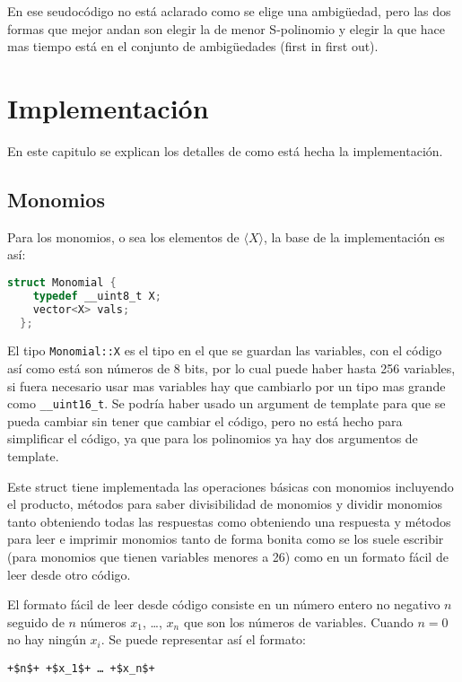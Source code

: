 \documentclass{amsbook} %
\theoremstyle{customstyle}
\theoremstyle{factstyle}
\begin{document}
En ese seudocódigo no está aclarado como se elige una ambigüedad, pero las dos formas que mejor andan son elegir la de menor S-polinomio y elegir la que hace mas tiempo está en el conjunto de ambigüedades (first in first out).

\chapter{Implementación}

En este capitulo se explican los detalles de como está hecha la implementación.

\section{Monomios}

Para los monomios, o sea los elementos de $⟨X⟩$, la base de la implementación es así:

\begin{lstlisting}[language=C++]
  struct Monomial {
    typedef __uint8_t X;
    vector<X> vals;
  };
\end{lstlisting}

El tipo \texttt{Monomial::X} es el tipo en el que se guardan las variables, con el código así como está son números de 8 bits, por lo cual puede haber hasta 256 variables, si fuera necesario usar mas variables hay que cambiarlo por un tipo mas grande como \texttt{\_\_uint16\_t}. Se podría haber usado un argument de template para que se pueda cambiar sin tener que cambiar el código, pero no está hecho para simplificar el código, ya que para los polinomios ya hay dos argumentos de template.

Este struct tiene implementada las operaciones básicas con monomios incluyendo el producto, métodos para saber divisibilidad de monomios y dividir monomios tanto obteniendo todas las respuestas como obteniendo una respuesta y métodos para leer e imprimir monomios tanto de forma bonita como se los suele escribir (para monomios que tienen variables menores a 26) como en un formato fácil de leer desde otro código.

El formato fácil de leer desde código consiste en un número entero no negativo $n$ seguido de $n$ números $x_1$, …, $x_n$ que son los números de variables. Cuando $n = 0$ no hay ningún $x_i$. Se puede representar así el formato:

\begin{lstlisting}[escapechar=+]
  +$n$+ +$x_1$+ … +$x_n$+
\end{lstlisting}
\end{document}
